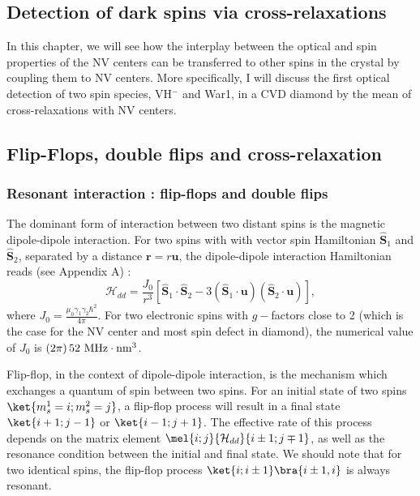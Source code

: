 \documentclass[a4paper,11pt]{report}
\begin{document}
 \begin{refsection}

\chapter{Detection of dark spins via cross-relaxations}
In this chapter, we will see how the interplay between the optical and spin properties of the NV centers can be transferred to other spins in the crystal by coupling them to NV centers. More specifically, I will discuss the first optical detection of two spin species, VH$^-$ and War1, in a CVD diamond by the mean of cross-relaxations with NV centers.
\section{Flip-Flops, double flips and cross-relaxation}
\label{Sec_CR}

\subsection{Resonant interaction : flip-flops and double flips}

The dominant form of interaction between two distant spins is the magnetic dipole-dipole interaction. For two spins with with vector spin Hamiltonian $\hat{\mathbf{S}}_1$ and $\hat{\mathbf{S}}_2$, separated by a distance $\mathbf{r}=r\mathbf{u}$, the dipole-dipole interaction Hamiltonian reads (see Appendix A) :
\begin{equation}
\mathcal{H}_{dd}=\frac{J_0}{r^3}\left[ \hat{\mathbf{S}}_1\cdot\hat{\mathbf{S}}_2 - 3 (\hat{\mathbf{S}}_1\cdot\mathbf{u})(\hat{\mathbf{S}}_2\cdot\mathbf{u})\right],
\end{equation}
where $J_0= \frac{\mu_0\gamma_1\gamma_2 \hbar^2}{4\pi}$. For two electronic spins with $g-$factors close to 2 (which is the case for the NV center and most spin defect in diamond), the numerical value of $J_0$ is $(2\pi)\,52\ \rm{MHz}\cdot\rm{nm}^3$.

Flip-flop, in the context of dipole-dipole interaction, is the mechanism which exchanges a quantum of spin between two spins. For an initial state of two spins $\ket{m_s^1=i;m_s^2=j}$, a flip-flop process will result in a final state $\ket{i+1;j-1}$ or $\ket{i-1;j+1}$. The effective rate of this process depends on the matrix element $\mel{i;j}{\mathcal{H}_{dd}}{i\pm 1;j \mp 1}$, as well as the resonance condition between the initial and final state. We should note that for two identical spins, the flip-flop process $\ket{i;i\pm 1}\bra{i\pm 1,i}$ is always resonant.


\end{refsection}
\end{document}
